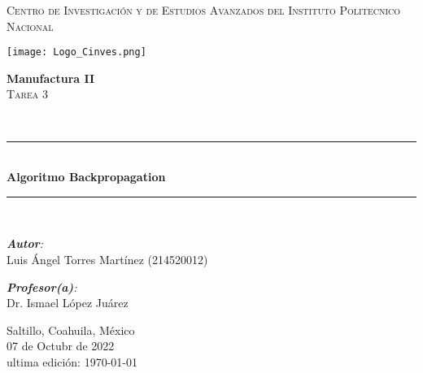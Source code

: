 \begin{center}
    \newcommand{\HRule}{\rule{\linewidth}{0.5mm}}
    \vspace*{0.5cm}

    \begin{spacing}{1.5}
        \textsc{\huge Centro de Investigación y de Estudios Avanzados del Instituto Politecnico Nacional}\\[0.15cm]
    \end{spacing}

    \begin{center}
        \texttt{[image: Logo\_Cinves.png]}
    \end{center}

    \begin{minipage}{0.9\textwidth}
        \begin{center}
            \textbf{\Large Manufactura II}\\
            \vspace*{0.5cm}
            \textsc{\LARGE Tarea 3 }
        \end{center}
    \end{minipage}\\[0.1cm]

 	\vspace*{1cm}

    \HRule \\[0.4cm]{\huge \bfseries Algoritmo Backpropagation}\\[0.4cm] %
    \HRule \\[1.5cm]

    \begin{minipage}{\textwidth}
        \begin{flushleft} \large
            \emph{\textbf{Autor}:}\\
            Luis Ángel Torres Martínez  (214520012)
        \end{flushleft}
    \end{minipage}

    \begin{minipage}{\textwidth}
        \vspace{-1cm}
        \begin{flushright} \large
            \emph{\textbf{Profesor(a)}:} \\
            Dr. Ismael López Juárez \\
        \end{flushright}
    \end{minipage}

    \vspace{3cm}
    
    Saltillo, Coahuila, México \\ %
    07 de Octubr de 2022\\ %
    ultima edición: {\today} %
\end{center}